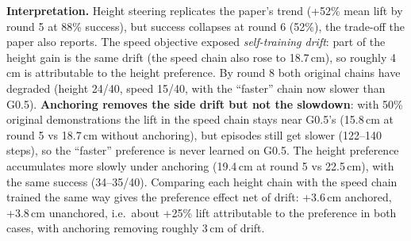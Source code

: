 \documentclass[10pt,a4paper]{article}
\begin{document}
\textbf{Interpretation.} Height steering replicates the paper's trend (+52\% mean lift by round 5 at 88\% success), but success collapses at round 6 (52\%), the trade-off the paper also reports. The speed objective exposed \emph{self-training drift}: part of the height gain is the same drift (the speed chain also rose to 18.7\,cm), so roughly 4\,cm is attributable to the height preference. By round 8 both original chains have degraded (height 24/40, speed 15/40, with the ``faster'' chain now slower than G0.5). \textbf{Anchoring removes the side drift but not the slowdown}: with 50\% original demonstrations the lift in the speed chain stays near G0.5's (15.8\,cm at round 5 vs 18.7\,cm without anchoring), but episodes still get slower (122--140 steps), so the ``faster'' preference is never learned on G0.5. The height preference accumulates more slowly under anchoring (19.4\,cm at round 5 vs 22.5\,cm), with the same success (34--35/40). Comparing each height chain with the speed chain trained the same way gives the preference effect net of drift: +3.6\,cm anchored, +3.8\,cm unanchored, i.e.\ about +25\% lift attributable to the preference in both cases, with anchoring removing roughly 3\,cm of drift.
\end{document}
